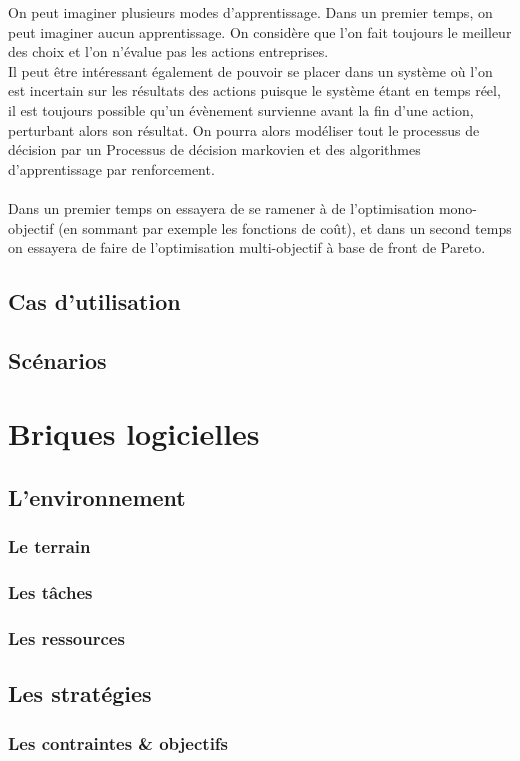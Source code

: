 On peut imaginer plusieurs modes d'apprentissage. Dans un premier temps, on peut imaginer aucun apprentissage. On considère que l'on fait toujours le meilleur des choix et l'on n'évalue pas les actions entreprises.\\
Il peut être intéressant également de pouvoir se placer dans un système où l'on est incertain sur les résultats des actions puisque le système étant en temps réel, il est toujours possible qu'un évènement survienne avant la fin d'une action, perturbant alors son résultat. On pourra alors modéliser tout le processus de décision par un Processus de décision markovien et des algorithmes d'apprentissage par renforcement.\\\\

Dans un premier temps on essayera de se ramener à de l'optimisation mono-objectif (en sommant par exemple les fonctions de coût), et dans un second temps on essayera de faire de l'optimisation multi-objectif à base de front de Pareto.
\subsection{Cas d'utilisation}
\subsection{Scénarios}
%
\section{Briques logicielles}
\subsection{L'environnement}
\subsubsection{Le terrain}
\subsubsection{Les tâches}
\subsubsection{Les ressources}
\subsection{Les stratégies}
\subsubsection{Les contraintes \& objectifs}
